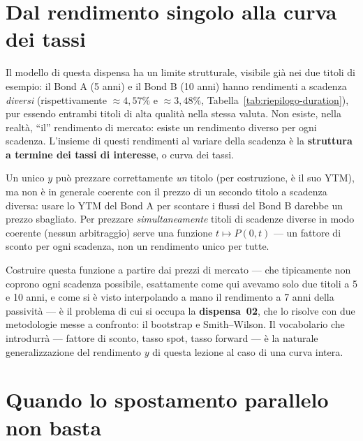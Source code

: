 \documentclass[11pt,a4paper]{article}
\theoremstyle{plain}
\theoremstyle{definition}
\theoremstyle{remark}
\begin{document}
\section{Dal rendimento singolo alla curva dei tassi}
\label{sec:verso-curva}

Il modello di questa dispensa ha un limite strutturale, visibile già nei due titoli di
esempio: il Bond A (5 anni) e il Bond B (10 anni) hanno rendimenti a scadenza \emph{diversi}
(rispettivamente $\approx 4{,}57\%$ e $\approx 3{,}48\%$, Tabella~\ref{tab:riepilogo-duration}),
pur essendo entrambi titoli di alta qualità nella stessa valuta. Non esiste, nella realtà, ``il''
rendimento di mercato: esiste un rendimento diverso per ogni scadenza. L'insieme di questi
rendimenti al variare della scadenza è la \textbf{struttura a termine dei tassi di interesse},
o curva dei tassi.

\begin{keybox}
Un unico $y$ può prezzare correttamente \emph{un} titolo (per costruzione, è il suo YTM), ma
non è in generale coerente con il prezzo di un secondo titolo a scadenza diversa: usare lo YTM
del Bond A per scontare i flussi del Bond B darebbe un prezzo sbagliato. Per prezzare
\emph{simultaneamente} titoli di scadenze diverse in modo coerente (nessun arbitraggio) serve
una funzione $t\mapsto P(0,t)$ --- un fattore di sconto per ogni scadenza, non un rendimento
unico per tutte.
\end{keybox}

Costruire questa funzione a partire dai prezzi di mercato --- che tipicamente non coprono ogni
scadenza possibile, esattamente come qui avevamo solo due titoli a 5 e 10 anni, e come si è
visto interpolando a mano il rendimento a 7 anni della passività --- è il problema di cui si
occupa la \textbf{dispensa~02}, che lo risolve con due metodologie messe a confronto: il
bootstrap e Smith--Wilson. Il vocabolario che introdurrà --- fattore di sconto, tasso spot,
tasso forward --- è la naturale generalizzazione del rendimento $y$ di questa lezione al caso
di una curva intera.

\section{Quando lo spostamento parallelo non basta}
\label{sec:oltre-parallelo}
\end{document}
